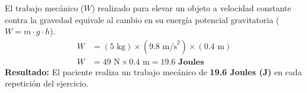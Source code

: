 \documentclass[12pt]{article}
\begin{document}
\begin{tcolorbox}
\begin{center}
    \end{center}

    \vspace{0.4cm}
    \begin{tcolorbox}[colback=medteal!10, colframe=medteal, arc=2mm, boxrule=1.2pt, title=\textbf{Desarrollo Matemático y Solución}]
        El trabajo mecánico ($W$) realizado para elevar un objeto a velocidad constante contra la gravedad equivale al cambio en su energía potencial gravitatoria ($W = m \cdot g \cdot h$).
        \begin{align*}
            W &= (5 \text{ kg}) \times (9.8 \text{ m/s}^2) \times (0.4 \text{ m}) \\[1ex]
            W &= 49 \text{ N} \times 0.4 \text{ m} = \mathbf{19.6 \text{ Joules}}
        \end{align*}
        \textbf{Resultado:} El paciente realiza un trabajo mecánico de \textbf{19.6 Joules (J)} en cada repetición del ejercicio.
    \end{tcolorbox}
    
\end{tcolorbox}
\end{document}
